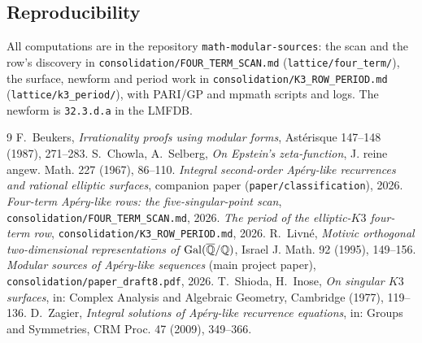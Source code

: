\documentclass[11pt]{amsart}
\theoremstyle{remark}
\begin{document}
\subsection*{Reproducibility}
All computations are in the repository \texttt{math-modular-sources}: the scan and the row's discovery in \texttt{consolidation/FOUR\_TERM\_SCAN.md} (\texttt{lattice/four\_term/}), the surface, newform and period work in \texttt{consolidation/K3\_ROW\_PERIOD.md} (\texttt{lattice/k3\_period/}), with PARI/GP and mpmath scripts and logs. The newform is \texttt{32.3.d.a} in the LMFDB.

\begin{thebibliography}{9}
 F.~Beukers, \emph{Irrationality proofs using modular forms}, Ast\'erisque 147--148 (1987), 271--283.
 S.~Chowla, A.~Selberg, \emph{On Epstein's zeta-function}, J. reine angew. Math. 227 (1967), 86--110.
 \emph{Integral second-order Ap\'ery-like recurrences and rational elliptic surfaces}, companion paper (\texttt{paper/classification}), 2026.
 \emph{Four-term Ap\'ery-like rows: the five-singular-point scan}, \texttt{consolidation/FOUR\_TERM\_SCAN.md}, 2026.
 \emph{The period of the elliptic-$K3$ four-term row}, \texttt{consolidation/K3\_ROW\_PERIOD.md}, 2026.
 R.~Livn\'e, \emph{Motivic orthogonal two-dimensional representations of $\mathrm{Gal}(\overline{\mathbb Q}/\mathbb Q)$}, Israel J. Math. 92 (1995), 149--156.
 \emph{Modular sources of Ap\'ery-like sequences} (main project paper), \texttt{consolidation/paper\_draft8.pdf}, 2026.
 T.~Shioda, H.~Inose, \emph{On singular $K3$ surfaces}, in: Complex Analysis and Algebraic Geometry, Cambridge (1977), 119--136.
 D.~Zagier, \emph{Integral solutions of Ap\'ery-like recurrence equations}, in: Groups and Symmetries, CRM Proc. 47 (2009), 349--366.
\end{thebibliography}
\end{document}
